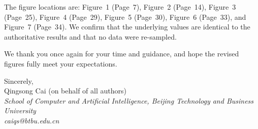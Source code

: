 \documentclass[11pt]{article}
\begin{document}
The figure locations are: Figure~1 (Page~7), Figure~2 (Page~14), Figure~3
(Page~25), Figure~4 (Page~29), Figure~5 (Page~30), Figure~6 (Page~33), and
Figure~7 (Page~34). We confirm that the underlying values are identical to the
authoritative results and that no data were re-sampled.

\vspace{0.6em}
We thank you once again for your time and guidance, and hope the revised figures
fully meet your expectations.

\vspace{0.8em}
Sincerely,\\
Qingsong Cai (on behalf of all authors)\\
\textit{School of Computer and Artificial Intelligence, Beijing Technology and
Business University}\\
\textit{caiqs@btbu.edu.cn}
\end{document}
